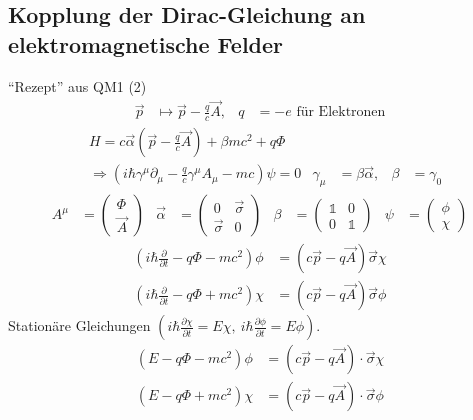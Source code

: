 \subsection{Kopplung der Dirac-Gleichung an elektromagnetische Felder}
``Rezept'' aus QM1 (2)
	\begin{align*}
		\vec{p} &\mapsto \vec{p} - \frac{q}{c} \vec{A},&
		q &= -e \text{ für Elektronen}
	\end{align*}		
	\begin{align*}
		&\boxed{
				H = c\vec{\alpha}
				\left(\vec{p} - \frac{q}{c} \vec{A}\right)
				+ \beta m c^2 + q \Phi
			} \\
		&\Rightarrow
		\boxed{
				\left(
					i \hbar \gamma^\mu \partial_\mu - \frac{q}{c} \gamma^\mu A_\mu - mc
				\right) \psi = 0
			} 
		& \gamma_\mu &= \beta \vec{\alpha},& \beta &= \gamma_0
	\end{align*}
	\begin{align*}
		A^\mu &= 
		\begin{pmatrix}
			\Phi \\ \vec{A}
		\end{pmatrix}
		& \vec{\alpha} &=
		\begin{pmatrix}
			0 & \vec{\sigma} \\
			\vec{\sigma} & 0
		\end{pmatrix}
		& \beta &= 
		\begin{pmatrix}
			\mathds{1} & 0 \\
			0 & \mathds{1}
		\end{pmatrix}
		& \psi &=
		\begin{pmatrix}
			\phi \\ \chi
		\end{pmatrix}
	\end{align*}
	\begin{align*}
		\left(
			i\hbar \frac{\partial}{\partial t} - q \Phi - mc^2
		\right) \phi 
		&= (c\vec{p} - q \vec{A}) \vec{\sigma} \chi \\
		\left(
			i \hbar \frac{\partial}{\partial t} - q \Phi + mc^2
		\right) \chi
		&= (c \vec{p} - q \vec{A}) \vec{\sigma} \phi
	\end{align*}
Stationäre Gleichungen $\left(i\hbar \frac{\partial \chi}{\partial t} = E \chi,~ i\hbar \frac{\partial \phi}{\partial t} = E \phi \right)$.
	\begin{align*}
		\left(E - q\Phi - mc^2\right) \phi 
		&= (c \vec{p} - q \vec{A}) \cdot \vec{\sigma} \chi \\
		\left(E - q \Phi + mc^2\right) \chi
		&= (c \vec{p} - q \vec{A}) \cdot \vec{\sigma} \phi
	\end{align*}
